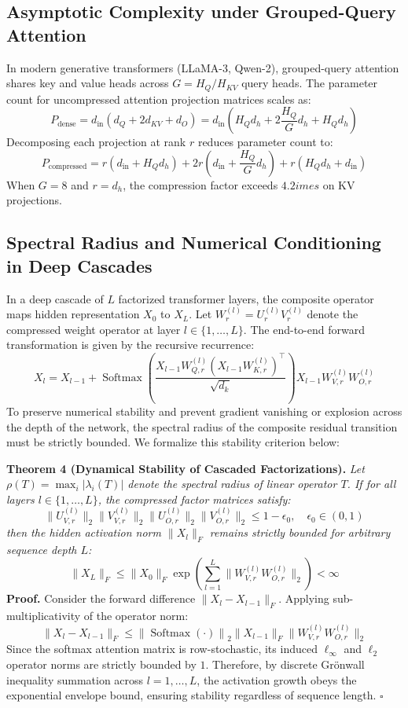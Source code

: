 \subsection*{Asymptotic Complexity under Grouped-Query Attention}
In modern generative transformers (LLaMA-3, Qwen-2), grouped-query attention shares key and value heads across $G = H_Q / H_{KV}$ query heads. The parameter count for uncompressed attention projection matrices scales as:
\[
P_{\text{dense}} = d_{\text{in}} \left( d_Q + 2 d_{KV} + d_O \right) = d_{\text{in}} \left( H_Q d_h + 2 \frac{H_Q}{G} d_h + H_Q d_h \right)
\]
Decomposing each projection at rank $r$ reduces parameter count to:
\[
P_{\text{compressed}} = r \left( d_{\text{in}} + H_Q d_h \right) + 2 r \left( d_{\text{in}} + \frac{H_Q}{G} d_h \right) + r \left( H_Q d_h + d_{\text{in}} \right)
\]
When $G = 8$ and $r = d_h$, the compression factor exceeds $4.2	imes$ on KV projections.

\subsection*{Spectral Radius and Numerical Conditioning in Deep Cascades}
In a deep cascade of $L$ factorized transformer layers, the composite operator maps hidden representation $X_0$ to $X_L$. Let $W^{(l)}_r = U^{(l)}_r V^{(l)}_r$ denote the compressed weight operator at layer $l \in \{1, \dots, L\}$. The end-to-end forward transformation is given by the recursive recurrence:
\[
X_l = X_{l-1} + \operatorname{Softmax}\left( \frac{X_{l-1} W^{(l)}_{Q, r} (X_{l-1} W^{(l)}_{K, r})^\top}{\sqrt{d_k}} \right) X_{l-1} W^{(l)}_{V, r} W^{(l)}_{O, r}
\]
To preserve numerical stability and prevent gradient vanishing or explosion across the depth of the network, the spectral radius of the composite residual transition must be strictly bounded. We formalize this stability criterion below:

\textbf{Theorem 4 (Dynamical Stability of Cascaded Factorizations).} \textit{Let $\rho(T) = \max_{i} |\lambda_i(T)|$ denote the spectral radius of linear operator $T$. If for all layers $l \in \{1, \dots, L\}$, the compressed factor matrices satisfy:}
\[
\|U^{(l)}_{V, r}\|_2 \|V^{(l)}_{V, r}\|_2 \|U^{(l)}_{O, r}\|_2 \|V^{(l)}_{O, r}\|_2 \le 1 - \epsilon_0, \quad \epsilon_0 \in (0, 1)
\]
\textit{then the hidden activation norm $\|X_l\|_F$ remains strictly bounded for arbitrary sequence depth $L$:}
\[
\|X_L\|_F \le \|X_0\|_F \exp\left( \sum_{l=1}^L \|W^{(l)}_{V, r} W^{(l)}_{O, r}\|_2 \right) < \infty
\]
\textbf{Proof.} Consider the forward difference $\|X_l - X_{l-1}\|_F$. Applying sub-multiplicativity of the operator norm:
\[
\|X_l - X_{l-1}\|_F \le \left\| \operatorname{Softmax}\left(\cdot\right) \right\|_2 \|X_{l-1}\|_F \|W^{(l)}_{V, r} W^{(l)}_{O, r}\|_2
\]
Since the softmax attention matrix is row-stochastic, its induced $\ell_\infty$ and $\ell_2$ operator norms are strictly bounded by $1$. Therefore, by discrete Gr\"onwall inequality summation across $l = 1, \dots, L$, the activation growth obeys the exponential envelope bound, ensuring stability regardless of sequence length. $\square$
